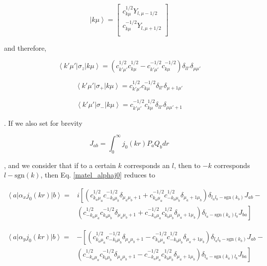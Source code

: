 \documentclass[]{report}
\newcommand{\bra}[1]{\left<#1\right|}
\newcommand{\ket}[1]{\left|#1\right>}
\newcommand{\braket}[3]{\bra{#1}#2\ket{#3}}
\begin{document}
\begin{equation}
\ket{k\mu} = \begin{bmatrix}
c_{k\mu}^{1/2} Y_{l,\mu-1/2} \\
c_{k\mu}^{-1/2} Y_{l,\mu+1/2} \\
\end{bmatrix}
\end{equation}

and therefore,

\begin{equation}\label{matel_sz}
\braket{k'\mu'}{\sigma_z}{k\mu} = \left(c_{k'\mu'}^{1/2}c_{k\mu}^{1/2}-c_{k'\mu'}^{-1/2}c_{k\mu}^{-1/2}\right)\delta_{ll'}\delta_{\mu\mu'}
\end{equation}

\begin{equation}\label{matel_sp}
\braket{k'\mu'}{\sigma_+}{k\mu} = c_{k'\mu'}^{1/2} c_{k\mu}^{-1/2}\delta_{ll'}\delta_{\mu+1\mu'}
\end{equation}

\begin{equation}\label{matel_sm}
\braket{k'\mu'}{\sigma_-}{k\mu} = c_{k'\mu'}^{-1/2} c_{k\mu}^{1/2}\delta_{ll'}\delta_{\mu\mu'+1}
\end{equation}

. If we also set for brevity

\begin{equation}\label{pq_ints}
J_{ab} = \int_{0}^{\infty}j_0(kr)P_aQ_b dr
\end{equation}

, and we consider that if to a certain $k$ corresponds an $l$, then to $-k$ corresponds $l-\mathrm{sgn}(k)$, then Eq. \ref{matel_alphaj0} reduces to

\begin{align}\label{matel_alphaxj0}
\braket{a}{\alpha_xj_0(kr)}{b} = & i\left[\left(c_{k_a\mu_a}^{1/2} c_{-k_b\mu_b}^{-1/2}\delta_{\mu_a\mu_b+1}
+ c_{k_a\mu_a}^{-1/2} c_{-k_b\mu_b}^{1/2}\delta_{\mu_a+1\mu_b}\right)
\delta_{l_al_b-\mathrm{sgn}(k_b)} J_{ab}  - \right. \\
&\left. 
\left(c_{-k_a\mu_a}^{1/2} c_{k_b\mu_b}^{-1/2}\delta_{\mu_a\mu_b+1}
+ c_{-k_a\mu_a}^{-1/2} c_{k_b\mu_b}^{1/2}\delta_{\mu_a+1\mu_b}\right)
\delta_{l_a-\mathrm{sgn}(k_a)l_b} J_{ba} 
\right] \nonumber
\end{align}

\begin{align}\label{matel_alphayj0}
\braket{a}{\alpha_yj_0(kr)}{b} = & -\left[\left(c_{k_a\mu_a}^{1/2} c_{-k_b\mu_b}^{-1/2}\delta_{\mu_a\mu_b+1}
- c_{k_a\mu_a}^{-1/2} c_{-k_b\mu_b}^{1/2}\delta_{\mu_a+1\mu_b}\right)
\delta_{l_al_b-\mathrm{sgn}(k_b)} J_{ab}  - \right. \\
&\left. 
\left(c_{-k_a\mu_a}^{1/2} c_{k_b\mu_b}^{-1/2}\delta_{\mu_a\mu_b+1}
- c_{-k_a\mu_a}^{-1/2} c_{k_b\mu_b}^{1/2}\delta_{\mu_a+1\mu_b}\right)
\delta_{l_a-\mathrm{sgn}(k_a)l_b} J_{ba} 
\right] \nonumber
\end{align}
\end{document}
